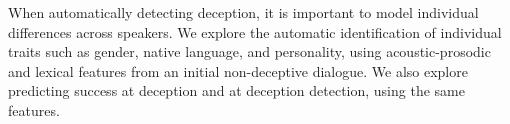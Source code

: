When automatically detecting deception, it is important to model individual differences across speakers.  We explore the automatic identification of individual traits such as gender, native language, and personality, using acoustic-prosodic and lexical features from an initial non-deceptive dialogue. We also explore predicting success at deception and at deception detection, using the same features.
